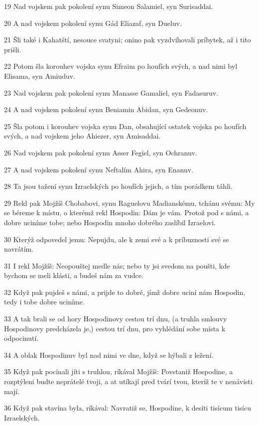 \par 19 Nad vojskem pak pokolení synu Simeon Salamiel, syn Surisaddai.
\par 20 A nad vojskem pokolení synu Gád Eliazaf, syn Dueluv.
\par 21 Šli také i Kahatští, nesouce svatyni; onino pak vyzdvihovali príbytek, až i tito prišli.
\par 22 Potom šla korouhev vojska synu Efraim po houfích svých, a nad nimi byl Elisama, syn Amiuduv.
\par 23 Nad vojskem pak pokolení synu Manasse Gamaliel, syn Fadasuruv.
\par 24 A nad vojskem pokolení synu Beniamin Abidan, syn Gedeonuv.
\par 25 Šla potom i korouhev vojska synu Dan, obsahující ostatek vojska po houfích svých, a nad vojskem jeho Ahiezer, syn Amisaddai.
\par 26 Nad vojskem pak pokolení synu Asser Fegiel, syn Ochranuv.
\par 27 A nad vojskem pokolení synu Neftalím Ahira, syn Enanuv.
\par 28 Ta jsou tažení synu Izraelských po houfích jejich, a tím porádkem táhli.
\par 29 Rekl pak Mojžíš Chobabovi, synu Raguelovu Madianskému, tchánu svému: My se béreme k místu, o kterémž rekl Hospodin: Dám je vám. Protož pod s námi, a dobre uciníme tobe; nebo Hospodin mnoho dobrého zaslíbil Izraelovi.
\par 30 Kterýž odpovedel jemu: Nepujdu, ale k zemi své a k príbuznosti své se navrátím.
\par 31 I rekl Mojžíš: Neopouštej medle nás; nebo ty jsi svedom na poušti, kde bychom se meli klásti, a budeš nám za vudce.
\par 32 Když pak pujdeš s námi, a prijde to dobré, jímž dobre uciní nám Hospodin, tedy i tobe dobre uciníme.
\par 33 A tak brali se od hory Hospodinovy cestou trí dnu, (a truhla smlouvy Hospodinovy predcházela je,) cestou trí dnu, pro vyhlédání sobe místa k odpocinutí.
\par 34 A oblak Hospodinuv byl nad nimi ve dne, když se hýbali z ležení.
\par 35 Když pak pocínali jíti s truhlou, ríkával Mojžíš: Povstaniž Hospodine, a rozptýleni budte neprátelé tvoji, a at utíkají pred tvárí tvou, kteríž te v nenávisti mají.
\par 36 Když pak stavína byla, ríkával: Navratiž se, Hospodine, k desíti tisícum tisícu Izraelských.

